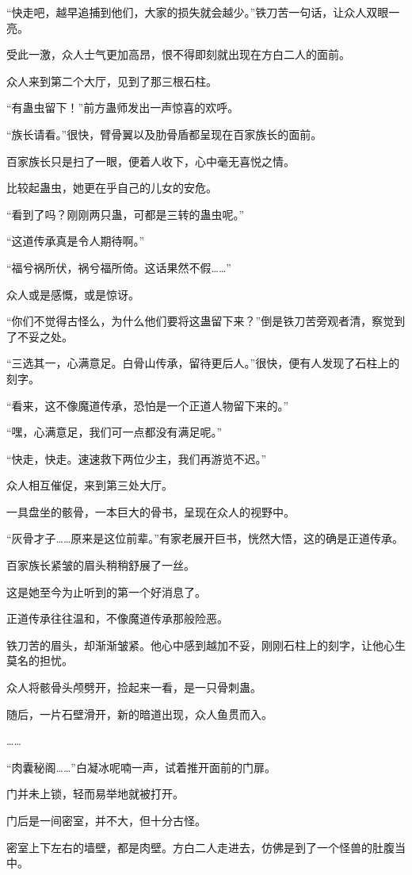 \begin{this_body}
“快走吧，越早追捕到他们，大家的损失就会越少。”铁刀苦一句话，让众人双眼一亮。

受此一激，众人士气更加高昂，恨不得即刻就出现在方白二人的面前。

众人来到第二个大厅，见到了那三根石柱。

“有蛊虫留下！”前方蛊师发出一声惊喜的欢呼。

“族长请看。”很快，臂骨翼以及肋骨盾都呈现在百家族长的面前。

百家族长只是扫了一眼，便着人收下，心中毫无喜悦之情。

比较起蛊虫，她更在乎自己的儿女的安危。

“看到了吗？刚刚两只蛊，可都是三转的蛊虫呢。”

“这道传承真是令人期待啊。”

“福兮祸所伏，祸兮福所倚。这话果然不假……”

众人或是感慨，或是惊讶。

“你们不觉得古怪么，为什么他们要将这蛊留下来？”倒是铁刀苦旁观者清，察觉到了不妥之处。

“三选其一，心满意足。白骨山传承，留待更后人。”很快，便有人发现了石柱上的刻字。

“看来，这不像魔道传承，恐怕是一个正道人物留下来的。”

“嘿，心满意足，我们可一点都没有满足呢。”

“快走，快走。速速救下两位少主，我们再游览不迟。”

众人相互催促，来到第三处大厅。

一具盘坐的骸骨，一本巨大的骨书，呈现在众人的视野中。

“灰骨才子……原来是这位前辈。”有家老展开巨书，恍然大悟，这的确是正道传承。

百家族长紧皱的眉头稍稍舒展了一丝。

这是她至今为止听到的第一个好消息了。

正道传承往往温和，不像魔道传承那般险恶。

铁刀苦的眉头，却渐渐皱紧。他心中感到越加不妥，刚刚石柱上的刻字，让他心生莫名的担忧。

众人将骸骨头颅劈开，捡起来一看，是一只骨刺蛊。

随后，一片石壁滑开，新的暗道出现，众人鱼贯而入。

……

“肉囊秘阁……”白凝冰呢喃一声，试着推开面前的门扉。

门并未上锁，轻而易举地就被打开。

门后是一间密室，并不大，但十分古怪。

密室上下左右的墙壁，都是肉壁。方白二人走进去，仿佛是到了一个怪兽的肚腹当中。


\end{this_body}
